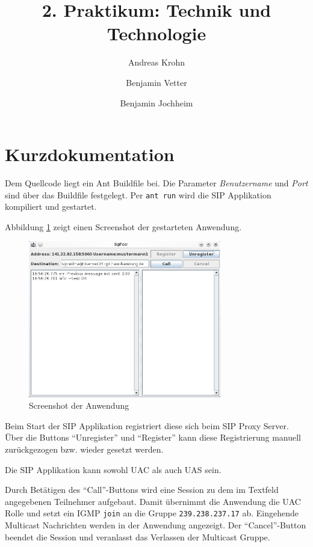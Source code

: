 \documentclass[a4paper,10pt]{article}
\title{2. Praktikum: Technik und Technologie}
\author{Andreas Krohn \and Benjamin Vetter \and Benjamin Jochheim}
\begin{document}
\maketitle

\section{Kurzdokumentation}

Dem Quellcode liegt ein Ant Buildfile bei. 
Die Parameter \emph{Benutzername} und \emph{Port} sind über das Buildfile festgelegt.
Per \verb=ant run= wird die SIP Applikation kompiliert und gestartet.

Abbildung \ref{screenshot} zeigt einen Screenshot der gestarteten Anwendung. 

\begin{figure}[h]
	\begin{center}
		\includegraphics[width=0.75\textwidth]{screenshot_SipPeer.png}
	\end{center}

	\caption{Screenshot der Anwendung}

	\label{screenshot}
\end{figure}


Beim Start der SIP Applikation registriert diese sich beim SIP Proxy Server. Über die Buttons "`Unregister"' und "`Register"' kann diese Registrierung manuell zurückgezogen bzw. wieder gesetzt werden.

Die SIP Applikation kann sowohl UAC als auch UAS sein. 

Durch Betätigen des "`Call"'-Buttons wird eine Session zu dem im Textfeld angegebenen Teilnehmer aufgebaut. Damit übernimmt die Anwendung die UAC Rolle und setzt ein IGMP \verb=join= an die Gruppe \verb=239.238.237.17= ab. Eingehende Multicast Nachrichten werden in der Anwendung angezeigt. Der "`Cancel"'-Button beendet die Session und veranlasst das Verlassen der Multicast Gruppe.
\end{document}
